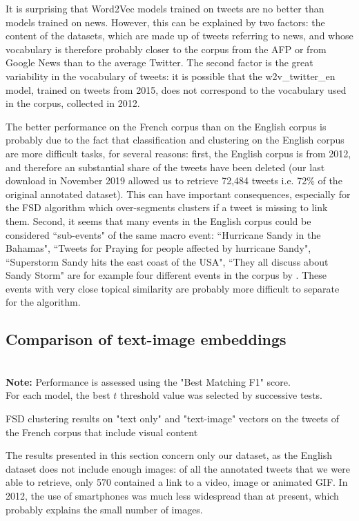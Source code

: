 It is surprising that Word2Vec models trained on tweets are no better than models trained on news. However, this can be explained by two factors: the content of the datasets, which are made up of tweets referring to news, and whose vocabulary is therefore probably closer to the corpus from the AFP or from Google News than to the average Twitter. The second factor is the great variability in the vocabulary of tweets: it is possible that the w2v\_twitter\_en model, trained on tweets from 2015, does not correspond to the vocabulary used in the \citet{mcminn_building_2013} corpus, collected in 2012.

The better performance on the French corpus than on the English corpus is probably due to the fact that classification
and clustering on the English corpus are more difficult tasks, for several reasons: first, the English corpus is from
2012, and therefore an substantial share of the tweets have been deleted (our last download in November 2019 allowed us to
retrieve 72,484 tweets i.e. 72\% of the original annotated dataset). This can have important consequences,
especially for the FSD algorithm which over-segments clusters if a tweet is missing to link them.
Second, it seems that many events in the English corpus could be considered
``sub-events" of the same macro event:
``Hurricane Sandy in the Bahamas", ``Tweets for Praying for people affected by hurricane Sandy", ``Superstorm Sandy
hits the east coast of the USA", ``They all discuss about Sandy Storm" are for example four different events in the
corpus by \citet{mcminn_building_2013}. These events with very close topical similarity are probably more difficult to
separate for the algorithm.

\subsection{Comparison of text-image embeddings}
\label{Subsec: text-image embeddings}
\begin{table}[ht]
\begin{center}

\\

{\scriptsize \textbf{Note:} Performance is assessed using the "Best Matching F1" score.\\ 
For each model, the best $t$ threshold value was selected by successive tests.}
\caption{FSD clustering results on "text only" and "text-image" vectors on the tweets of the French corpus that include visual content} \label{Tab: text_image}
\end{center}
\end{table}
The results presented in this section concern only our dataset, as the English dataset does not include enough images: of all the annotated tweets that we were able to retrieve, only 570 contained a link to a video, image or animated GIF. In 2012, the use of smartphones was much less widespread than at present, which probably explains the small number of images.


